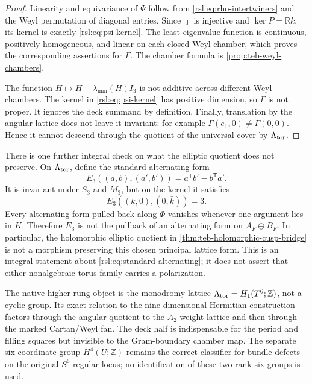 \begin{proof}
Linearity and equivariance of \(\Psi\) follow from
\eqref{rsl:eq:rho-intertwiners} and the Weyl permutation of diagonal entries.
Since \(\jmath\) is injective and \(\ker P=\mathbb Rk\), its kernel is exactly
\eqref{rsl:eq:psi-kernel}.  The least-eigenvalue function is continuous,
positively homogeneous, and linear on each closed Weyl chamber, which proves
the corresponding assertions for \(\Gamma\).  The chamber formula is
\cref{prop:teb-weyl-chambers}.

The function \(H\mapsto H-\lambda_{\min}(H)I_3\) is not additive across
different Weyl chambers.  The kernel in \eqref{rsl:eq:psi-kernel} has positive
dimension, so \(\Gamma\) is not proper.  It ignores the deck summand by
definition.  Finally, translation by the angular lattice does not leave it
invariant: for example \(\Gamma(e_1,0)\neq\Gamma(0,0)\).  Hence it cannot
descend through the quotient of the universal cover by
\(\Lambda_{\rm tor}\).
\end{proof}

There is one further integral check on what the elliptic quotient does not
preserve.  On \(\Lambda_{\rm tor}\), define the standard alternating form
\begin{equation}
 E_3((a,b),(a',b'))=a^{\mathsf T}b'-b^{\mathsf T}a'.
 \label{rsl:eq:standard-alternating}
\end{equation}
It is invariant under \(S_3\) and \(M_3\), but on the kernel it satisfies
\begin{equation}
 E_3((k,0),(0,\bar k))=3.
 \label{rsl:eq:kernel-degree-three}
\end{equation}
Every alternating form pulled back along \(\Phi\) vanishes whenever one
argument lies in \(K\).  Therefore \(E_3\) is not the pullback of an
alternating form on \(A_F\oplus B_F\).  In particular, the holomorphic
elliptic quotient in \cref{thm:teb-holomorphic-cusp-bridge} is not a morphism
preserving this chosen principal lattice form.  This is an integral statement
about \eqref{rsl:eq:standard-alternating}; it does not assert that either
nonalgebraic torus family carries a polarization.

\begin{auditrecord}
The native higher-rung object is the monodromy lattice
\(\Lambda_{\rm tor}=H_1(T^6;\mathbb Z)\), not a cyclic group.  Its exact
relation to the nine-dimensional Hermitian construction factors through the
angular quotient to the \(A_2\) weight lattice and then through the marked
Cartan/Weyl fan.  The deck half is indispensable for the period and filling
squares but invisible to the Gram-boundary chamber map.  The separate
six-coordinate group \(H^4(U;\mathbb Z)\) remains the correct classifier for
bundle defects on the original \(S^6\) regular locus; no identification of
these two rank-six groups is used.
\end{auditrecord}
